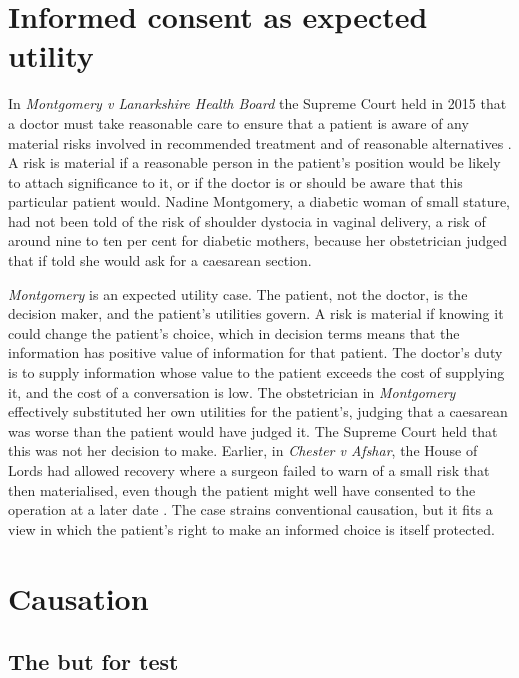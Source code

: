 \section{Informed consent as expected utility}

In \emph{Montgomery v Lanarkshire Health Board} the Supreme Court held in 2015 that a doctor must take reasonable care to ensure that a patient is aware of any material risks involved in recommended treatment and of reasonable alternatives \citep{montgomery2015}. A risk is material if a reasonable person in the patient's position would be likely to attach significance to it, or if the doctor is or should be aware that this particular patient would. Nadine Montgomery, a diabetic woman of small stature, had not been told of the risk of shoulder dystocia in vaginal delivery, a risk of around nine to ten per cent for diabetic mothers, because her obstetrician judged that if told she would ask for a caesarean section.

\emph{Montgomery} is an expected utility case. The patient, not the doctor, is the decision maker, and the patient's utilities govern. A risk is material if knowing it could change the patient's choice, which in decision terms means that the information has positive value of information for that patient. The doctor's duty is to supply information whose value to the patient exceeds the cost of supplying it, and the cost of a conversation is low. The obstetrician in \emph{Montgomery} effectively substituted her own utilities for the patient's, judging that a caesarean was worse than the patient would have judged it. The Supreme Court held that this was not her decision to make. Earlier, in \emph{Chester v Afshar}, the House of Lords had allowed recovery where a surgeon failed to warn of a small risk that then materialised, even though the patient might well have consented to the operation at a later date \citep{chester2004}. The case strains conventional causation, but it fits a view in which the patient's right to make an informed choice is itself protected.

\section{Causation}

\subsection{The but for test}

